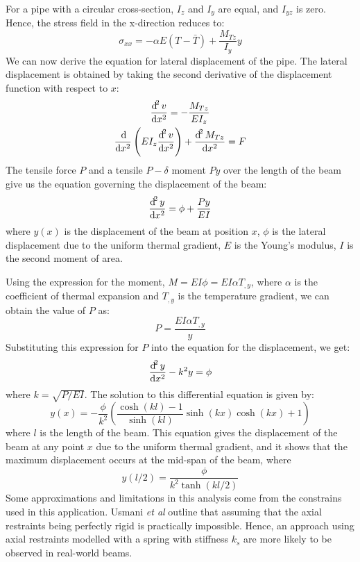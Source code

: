 For a pipe with a circular cross-section, $I_z$ and $I_y$ are equal, and $I_{yz}$ is zero. Hence, the stress field in the x-direction reduces to:
\begin{equation}
    \sigma_{xx} = -\alpha E \left(T - \bar{T}\right) + \frac{M_{Tz}}{I_y}y
\end{equation}
We can now derive the equation for lateral displacement of the pipe. The lateral displacement is obtained by taking the second derivative of the displacement function with respect to $x$:
\begin{gather}
    \frac{\dif^2 v}{\dif x^2} = - \frac{M_{Tz}}{EI_z}\\
    \frac{\dif}{\dif x^2}\left(EI_z\frac{\dif^2 v}{\dif x^2}\right) + \frac{\dif^2 M_{Tz}}{\dif x^2} = F
\end{gather}
The tensile force $P$ and a tensile $P-\delta$ moment $Py$ over the length of the beam give us the equation governing the displacement of the beam:
\begin{equation}
    \frac{\dif^2 y}{\dif x^2} = \phi + \frac{Py}{EI}
\end{equation}
where $y(x)$ is the displacement of the beam at position $x$, $\phi$ is the lateral displacement due to the uniform thermal gradient, $E$ is the Young's modulus, $I$ is the second moment of area.

Using the expression for the moment, $M = EI \phi = EI\alpha T_{,y}$, where $\alpha$ is the coefficient of thermal expansion and $T_{,y}$ is the temperature gradient, we can obtain the value of $P$ as:
\begin{equation}
    P = \frac{EI\alpha T_{,y}}{y}
\end{equation}
Substituting this expression for $P$ into the equation for the displacement, we get:
\begin{equation}
    \frac{\dif^2 y}{\dif x^2} - k^2 y = \phi
\end{equation}
where $k = \sqrt{P/EI}$. The solution to this differential equation is given by:
\begin{equation}
    y(x) = -\frac{\phi}{k^2}\left(\frac{\cosh(kl) - 1}{\sinh(kl)}\sinh(kx)\cosh(kx)+1\right)
\end{equation}
where $l$ is the length of the beam. This equation gives the displacement of the beam at any point $x$ due to the uniform thermal gradient, and it shows that the maximum displacement occurs at the mid-span of the beam, where
\begin{equation}
    y(l/2) = \frac{\phi}{k^2 \tanh(kl/2)}
\end{equation}
Some approximations and limitations in this analysis come from the constrains used in this application. Usmani \textit{et al} outline that assuming that the axial restraints being perfectly rigid is practically impossible. Hence, an approach using axial restraints modelled with a spring with stiffness $k_s$ are more likely to be observed in real-world beams.
